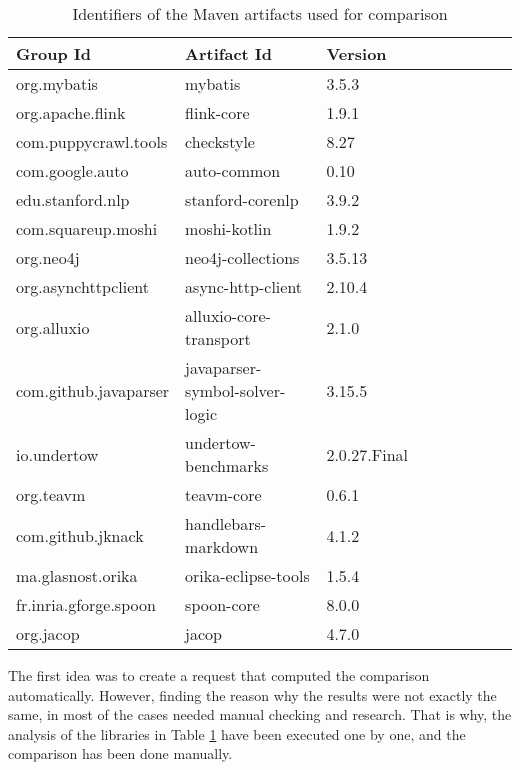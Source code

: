 \begin{table}[h]
    \begin{center}
    \begin{tabular}{|l|l|l|l|l|l|l|l|l|}
    \hline
    Group Id              & Artifact Id                     & Version       \\
    \hline
    org.mybatis           &	mybatis	                        & 3.5.3         \\
    org.apache.flink      & flink-core                      & 1.9.1         \\
    com.puppycrawl.tools  & checkstyle                      & 8.27          \\
    com.google.auto       & auto-common                     & 0.10          \\
    edu.stanford.nlp      & stanford-corenlp                & 3.9.2         \\
    com.squareup.moshi    & moshi-kotlin                    & 1.9.2         \\
    org.neo4j             & neo4j-collections               & 3.5.13        \\
    org.asynchttpclient   & async-http-client               & 2.10.4        \\
    org.alluxio           & alluxio-core-transport          & 2.1.0         \\
    com.github.javaparser & javaparser-symbol-solver-logic  & 3.15.5        \\
    io.undertow           & undertow-benchmarks             & 2.0.27.Final  \\
    org.teavm             & teavm-core                      & 0.6.1         \\
    com.github.jknack     & handlebars-markdown             & 4.1.2         \\
    ma.glasnost.orika     & orika-eclipse-tools             & 1.5.4         \\
    fr.inria.gforge.spoon & spoon-core                      & 8.0.0         \\
    org.jacop             & jacop                           & 4.7.0         \\
    \hline
    \end{tabular}
    \end{center}
    \caption{Identifiers of the Maven artifacts used for comparison}
    \label{table:comparison-artifacts}
\end{table}

The first idea was to create a request that computed the comparison automatically. However, finding the reason why the results were not exactly the same, in most of the cases needed manual checking and research. That is why, the analysis of the libraries in Table \ref{table:comparison-artifacts} have been executed one by one, and the comparison has been done manually.

